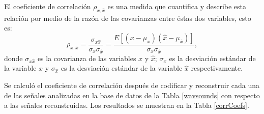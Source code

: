 El coeficiente de correlación $\rho_{x,\hat{x}}$ es una medida que cuantifica y describe esta relación por medio de la razón de las covarianzas entre éstas dos variables, esto es:
\begin{equation}
	\rho_{x,\hat{x}} = \frac{\sigma_{x\hat{x}}}{\sigma_{x}\sigma_{\hat{x}}} = \frac{E[(x-\mu_{x})(\hat{x}-\mu_{\hat{x}})]}{\sigma_{x}\sigma_{\hat{x}}},
\end{equation}
donde $\sigma_{x\hat{x}}$ es la covarianza de las variables $x$ y $\hat{x}$; $\sigma_{x}$ es la desviación estándar de la variable $x$ y $\sigma_{\hat{x}}$ es la desviación estándar de la variable $\hat{x}$ respectivamente.
 
 Se calculó el coeficiente de correlación después de codificar y reconstruir cada una de las señales analizadas en la base de datos de la Tabla \ref{wavsounds} con respecto a las señales reconstruidas. Los resultados se muestran en la Tabla \ref{corrCoefs}.

